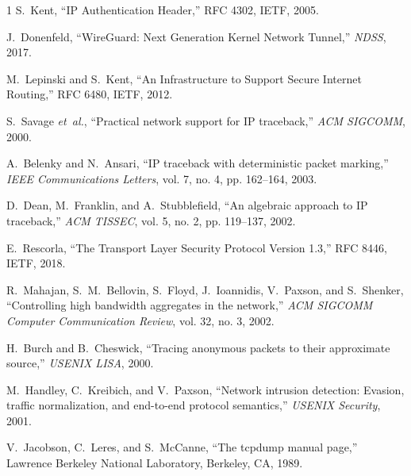 \documentclass[journal]{IEEEtran}
\begin{document}
\begin{thebibliography}{1}
S.~Kent, ``IP Authentication Header,'' RFC 4302, IETF, 2005.

J.~Donenfeld, ``WireGuard: Next Generation Kernel Network Tunnel,'' \emph{NDSS}, 2017.

M.~Lepinski and S.~Kent, ``An Infrastructure to Support Secure Internet Routing,'' RFC 6480, IETF, 2012.

S.~Savage \emph{et~al.}, ``Practical network support for IP traceback,'' \emph{ACM SIGCOMM}, 2000.

A.~Belenky and N.~Ansari, ``IP traceback with deterministic packet marking,'' \emph{IEEE Communications Letters}, vol. 7, no. 4, pp. 162--164, 2003.

D.~Dean, M.~Franklin, and A.~Stubblefield, ``An algebraic approach to IP traceback,'' \emph{ACM TISSEC}, vol. 5, no. 2, pp. 119--137, 2002.

E.~Rescorla, ``The Transport Layer Security Protocol Version 1.3,'' RFC 8446, IETF, 2018.

R.~Mahajan, S.~M.~Bellovin, S.~Floyd, J.~Ioannidis, V.~Paxson, and S.~Shenker, ``Controlling high bandwidth aggregates in the network,'' \emph{ACM SIGCOMM Computer Communication Review}, vol. 32, no. 3, 2002.

H.~Burch and B.~Cheswick, ``Tracing anonymous packets to their approximate source,'' \emph{USENIX LISA}, 2000.

M.~Handley, C.~Kreibich, and V.~Paxson, ``Network intrusion detection: Evasion, traffic normalization, and end-to-end protocol semantics,'' \emph{USENIX Security}, 2001.

V.~Jacobson, C.~Leres, and S.~McCanne, ``The tcpdump manual page,'' Lawrence Berkeley National Laboratory, Berkeley, CA, 1989.

\end{thebibliography}
\end{document}
